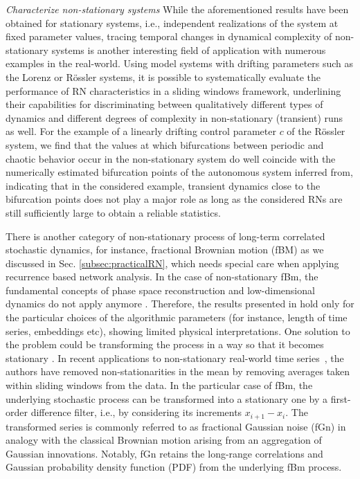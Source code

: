 				
		\emph{Characterize non-stationary systems}
		While the aforementioned results have been obtained for stationary systems, i.e., independent realizations of the system at fixed parameter values, tracing temporal changes in dynamical complexity of non-stationary systems is another interesting field of application with numerous examples in the real-world. Using model systems with drifting parameters such as the Lorenz \cite{Donges2011} or R\"ossler systems, it is possible to systematically evaluate the performance of RN characteristics in a sliding windows framework, underlining their capabilities for discriminating between qualitatively different types of dynamics and different degrees of complexity in non-stationary (transient) runs as well. For the example of a linearly drifting control parameter $c$ of the R\"ossler system, we find that the values at which bifurcations between periodic and chaotic behavior occur in the non-stationary system do well coincide with the numerically estimated bifurcation points of the autonomous system inferred from, indicating that in the considered example, transient dynamics close to the bifurcation points does not play a major role as long as the considered RNs are still sufficiently large to obtain a reliable statistics. 
		
		There is another category of non-stationary process of long-term correlated stochastic dynamics, for instance, fractional Brownian motion (fBM) as we discussed in Sec. \ref{subsec:practicalRN}, which needs special care when applying recurrence based network analysis. In the case of non-stationary fBm, the fundamental concepts of phase space reconstruction and low-dimensional dynamics do not apply anymore \cite{Zou2015}. Therefore, the results presented in \cite{Liu2014} hold only for the particular choices of the algorithmic parameters (for instance, length of time series, embeddings etc), showing limited physical interpretations. One solution to the problem could be transforming the process in a way so that it becomes stationary \cite{Zou2015}. In recent applications to non-stationary real-world time series~\cite{Donges2011,Donges2011a}, the authors have removed non-stationarities in the mean by removing averages taken within sliding windows from the data. In the particular case of fBm, the underlying stochastic process can be transformed into a stationary one by a first-order difference filter, i.e., by considering its increments $x_{i+1}- x_i$. The transformed series is commonly referred to as fractional Gaussian noise (fGn) in analogy with the classical Brownian motion arising from an aggregation of Gaussian innovations. Notably, fGn retains the long-range correlations and Gaussian probability density function (PDF) from the underlying fBm process. 
		

